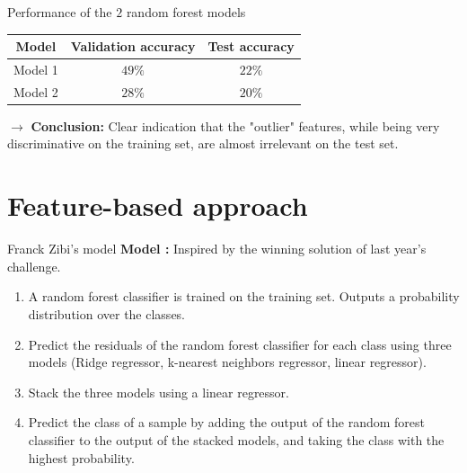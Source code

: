 \documentclass{beamer}
\begin{document}
\begin{frame}{Performance of the $2$ random forest models}
    \begin{table}[H]
        \begin{center}
            \begin{tabular}{|c|c|c|}
                \hline
                \textbf{Model} & \textbf{Validation accuracy} & \textbf{Test accuracy} \\
                \hline
                Model 1        & $49 \%$                      & $22 \%$                \\
                \hline
                Model 2        & $28 \%$                      & $20 \%$                \\
                \hline
            \end{tabular}
        \end{center}
    \end{table}
    $\rightarrow$ \textbf{Conclusion:} Clear indication that the "outlier" features, while being very discriminative on the training set, are almost irrelevant on the test set.
\end{frame}
\section{Feature-based approach}
\begin{frame}{Franck Zibi's model}
    \textbf{Model :} Inspired by the winning solution of last year’s challenge.
    \begin{enumerate}
        \item A random forest classifier is trained on the training set. Outputs a probability distribution over the classes.
        \item Predict the residuals of the random forest classifier for each class using three models (Ridge regressor, k-nearest neighbors regressor, linear regressor).
        \item Stack the three models using a linear regressor.
        \item Predict the class of a sample by adding the output of the random forest classifier to the output of the stacked models, and taking the class with the highest probability.
    \end{enumerate}
\end{frame}
\end{document}

